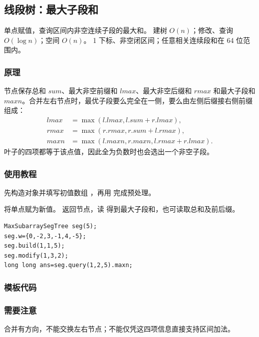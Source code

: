 \subsection{线段树：最大子段和}
\label{ds:seg-max-subarray}
\AlgorithmInfo
    {单点赋值，查询区间内非空连续子段的最大和。}
    {建树 $O(n)$；修改、查询 $O(\log n)$；空间 $O(n)$。}
    {1 下标、非空闭区间；任意相关连续段和在 64 位范围内。}
\subsubsection*{原理}
节点保存总和 $sum$、最大非空前缀和 $lmax$、最大非空后缀和 $rmax$ 和最大子段和 $maxn$。合并左右节点时，最优子段要么完全在一侧，要么由左侧后缀接右侧前缀组成：
\[
\begin{aligned}
 lmax&=\max(l.lmax,l.sum+r.lmax),\\
 rmax&=\max(r.rmax,r.sum+l.rmax),\\
 maxn&=\max(l.maxn,r.maxn,l.rmax+r.lmax).
\end{aligned}
\]
叶子的四项都等于该点值，因此全为负数时也会选出一个非空子段。

\subsubsection*{使用教程}
先构造对象并填写初值数组 ，再用  完成预处理。

 将单点赋为新值。 返回节点，读  得到最大子段和，也可读取总和及前后缀。
\begin{lstlisting}[style=mtycpp,numbers=none]
MaxSubarraySegTree seg(5);
seg.w={0,-2,3,-1,4,-5};
seg.build(1,1,5);
seg.modify(1,3,2);
long long ans=seg.query(1,2,5).maxn;
\end{lstlisting}
\subsubsection*{模板代码}
\subsubsection*{需要注意}
合并有方向，不能交换左右节点；不能仅凭这四项信息直接支持区间加法。
